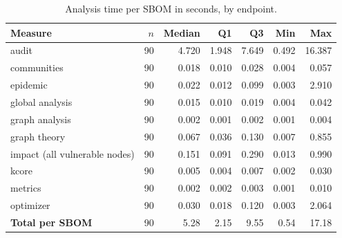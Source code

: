 \begin{table}[!htpb]
    \centering
    \small
    \caption{Analysis time per SBOM in seconds, by endpoint.}
    \label{tab:eval-performance}
    \begin{tabular}{lrrrrrr}
        \toprule
        \textbf{Measure} & \(n\) & \textbf{Median} & \textbf{Q1} & \textbf{Q3} & \textbf{Min} & \textbf{Max} \\
        \midrule
        audit & 90 & 4.720 & 1.948 & 7.649 & 0.492 & 16.387 \\
        communities & 90 & 0.018 & 0.010 & 0.028 & 0.004 & 0.057 \\
        epidemic & 90 & 0.022 & 0.012 & 0.099 & 0.003 & 2.910 \\
        global analysis & 90 & 0.015 & 0.010 & 0.019 & 0.004 & 0.042 \\
        graph analysis & 90 & 0.002 & 0.001 & 0.002 & 0.001 & 0.004 \\
        graph theory & 90 & 0.067 & 0.036 & 0.130 & 0.007 & 0.855 \\
        impact (all vulnerable nodes) & 90 & 0.151 & 0.091 & 0.290 & 0.013 & 0.990 \\
        kcore & 90 & 0.005 & 0.004 & 0.007 & 0.002 & 0.030 \\
        metrics & 90 & 0.002 & 0.002 & 0.003 & 0.001 & 0.010 \\
        optimizer & 90 & 0.030 & 0.018 & 0.120 & 0.003 & 2.064 \\
        \textbf{Total per SBOM} & 90 & 5.28 & 2.15 & 9.55 & 0.54 & 17.18 \\
        \bottomrule
    \end{tabular}
\end{table}
